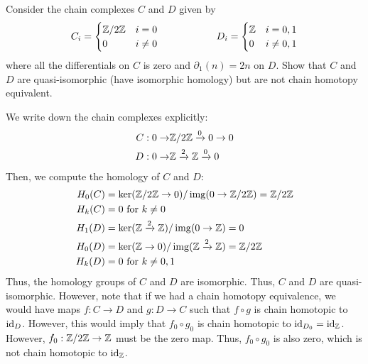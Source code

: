 \documentclass[12pt]{article}
\begin{document}



\begin{problem}{1}
    Consider the chain complexes $C$ and $D$ given by 
\[ C_i = \begin{cases} \mathbb Z/2\mathbb Z & i = 0 \\ 0 & i \neq 0 \end{cases} \hspace{2 cm}  D_i = \begin{cases} \mathbb Z & i = 0,1 \\ 0 & i \neq 0,1 \end{cases} \]
where all the differentials on $C$ is zero and $\partial_1(n)= 2n$ on $D$. Show that $C$ and $D$ are quasi-isomorphic (have isomorphic homology) but are not chain homotopy equivalent.
\end{problem}
\begin{solution}
    We write down the chain complexes explicitly: 
    \begin{align*}
        C: 0 \to &\mathbb Z/2\mathbb Z \xrightarrow{0} 0 \to 0 \\
        D: 0 \to &\mathbb Z \xrightarrow{2} \mathbb Z \xrightarrow{0} 0
    \end{align*}
    Then, we compute the homology of $C$ and $D$:
    \begin{align*}
        H_0(C) &= \ker(\mathbb Z/2\mathbb Z \to 0)/\operatorname{img}(0 \to \mathbb Z/2\mathbb Z) = \mathbb Z/2\mathbb Z \\
        H_k(C) &= 0 \text{ for } k \neq 0 \\
        H_1(D) &= \ker(\mathbb Z \xrightarrow{2} \mathbb Z)/\operatorname{img}(0 \to \mathbb Z) = 0 \\
        H_0(D) &= \ker(\mathbb Z \to 0)/\operatorname{img}(\mathbb Z \xrightarrow{2} \mathbb Z) = \mathbb Z/2\mathbb Z \\
        H_k(D) &= 0 \text{ for } k \neq 0,1
    \end{align*}
    Thus, the homology groups of $C$ and $D$ are isomorphic. Thus, $C$ and $D$ are quasi-isomorphic. However, note that if we had a chain homotopy equivalence, we would have maps $f: C \to D$ and $g: D \to C$ such that $f \circ g$ is chain homotopic to $\operatorname{id}_D$. However, this would imply that $f_0 \circ g_0$ is chain homotopic to $\operatorname{id}_{D_0} = \operatorname{id}_{\mathbb Z}$. However, $f_0: \mathbb Z/2\mathbb Z \to \mathbb Z$ must be the zero map. Thus, $f_0 \circ g_0$ is also zero, which is not chain homotopic to $\operatorname{id}_\mathbb Z$.
\end{solution}
\newpage
\end{document}
